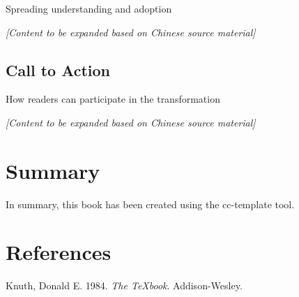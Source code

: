 \documentclass[
  Letterpaper,
]{scrbook}
\newlength{\cslhangindent}
\newenvironment{CSLReferences}[2] %
 {\begin{list}{}{%
  \setlength{\itemindent}{0pt}
  \setlength{\leftmargin}{0pt}
  \setlength{\parsep}{0pt}
  \ifodd #1
   \setlength{\leftmargin}{\cslhangindent}
   \setlength{\itemindent}{-1\cslhangindent}
  \fi
  \setlength{\itemsep}{#2\baselineskip}}}
 {\end{list}}
\begin{document}
Spreading understanding and adoption

\emph{{[}Content to be expanded based on Chinese source material{]}}

\section{Call to Action}\label{call-to-action}

How readers can participate in the transformation

\emph{{[}Content to be expanded based on Chinese source material{]}}


\chapter{Summary}\label{summary}

In summary, this book has been created using the cc-template tool.


\chapter*{References}\label{references}


\label{refs}
\begin{CSLReferences}{1}{0}
Knuth, Donald E. 1984. \emph{The TeXbook}. Addison-Wesley.

\end{CSLReferences}


\backmatter
\end{document}
